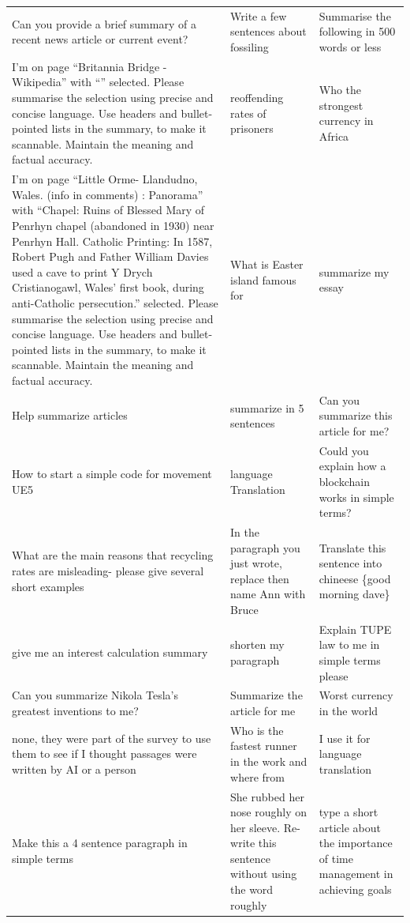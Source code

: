 \begin{table}[ht]
\begin{tabular}{p{4.3cm}p{4.3cm}p{4.3cm}}
Can you provide a brief summary of a recent news article or current event? & Write a few sentences about fossiling & Summarise the following in 500 words or less \\[4pt]
I’m on page “Britannia Bridge - Wikipedia” with “” selected.  Please summarise the selection using precise and concise language. Use headers and bullet-pointed lists in the summary, to make it scannable. Maintain the meaning and factual accuracy. & reoffending rates of prisoners & Who the strongest currency in Africa \\[4pt]
I’m on page “Little Orme- Llandudno, Wales. (info in comments) : Panorama” with “Chapel: Ruins of Blessed Mary of Penrhyn chapel (abandoned in 1930) near Penrhyn Hall.         Catholic Printing: In 1587, Robert Pugh and Father William Davies used a cave to print Y Drych Cristianogawl, Wales’ first book, during anti-Catholic persecution.” selected.  Please summarise the selection using precise and concise language. Use headers and bullet-pointed lists in the summary, to make it scannable. Maintain the meaning and factual accuracy. & What is Easter island famous for & summarize my essay \\[4pt]
Help summarize articles & summarize in 5 sentences & Can you summarize this article for me? \\[4pt]
How to start a simple code for movement UE5 & language Translation & Could you explain how a blockchain works in simple terms? \\[4pt]
What are the main reasons that recycling rates are misleading- please give several short examples & In the paragraph you just wrote, replace then name Ann with Bruce & Translate this sentence into chineese \{good morning dave\} \\[4pt]
give me an interest calculation summary & shorten my paragraph & Explain TUPE law to me in simple terms please \\[4pt]
Can you summarize Nikola Tesla's greatest inventions to me? & Summarize the article for me & Worst currency in the world \\[4pt]
none, they were part of the survey to use them to see if I thought passages were written by AI or a person & Who is the fastest runner in the work and where from & I use it for language translation \\[4pt]
Make this a 4 sentence paragraph in simple terms & She rubbed her nose roughly on her sleeve. Re-write this sentence without using the word roughly & type a  short article about the importance of time management in achieving goals \\[4pt]

\end{tabular}
\end{table}
